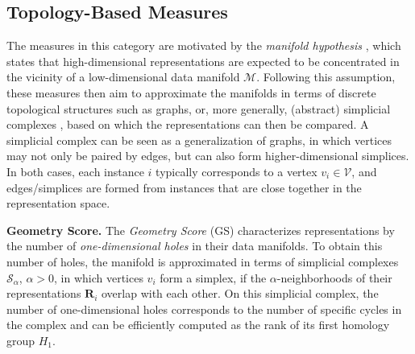 \documentclass{article}
\newcommand{\R}{\bm{R}}
\newcommand{\subheader}{\textbf}
\begin{document}
\subsection{Topology-Based Measures}\label{sec:topological}

The measures in this category are motivated by the \emph{manifold hypothesis} \cite[Sec. 5.11.3]{goodfellow_deep_2016}, which states that high-dimensional representations are expected to be concentrated in the vicinity of a low-dimensional data manifold $\mathcal{M}$.
Following this assumption, these measures then aim to approximate the manifolds in terms of discrete topological structures such as graphs, or, more generally, (abstract) simplicial complexes \cite{hatcher_algebraic_2005}, based on which the representations can then be compared.
A simplicial complex can be seen as a generalization of graphs, in which vertices may not only be paired by edges, but can also form higher-dimensional simplices.
In both cases, each instance $i$ typically corresponds to a vertex $v_i\in\mathcal{V}$, and edges/simplices are formed from instances that are close together in the representation space.


\subheader{Geometry Score.}
The \emph{Geometry Score} (GS) \cite{khrulkov_geometry_2018} characterizes representations by the number of \emph{one-dimensional holes} in their data manifolds.
To obtain this number of holes, the manifold is approximated in terms of simplicial complexes $\mathcal{S}_\alpha$, $\alpha>0$, in which vertices $v_i$ form a simplex, if the $\alpha$-neighborhoods of their representations $\R_i$ overlap with each other.
On this simplicial complex, the number of one-dimensional holes corresponds to the number of specific cycles in the complex and can be efficiently computed as the rank of its first homology group $H_1$.
\end{document}
